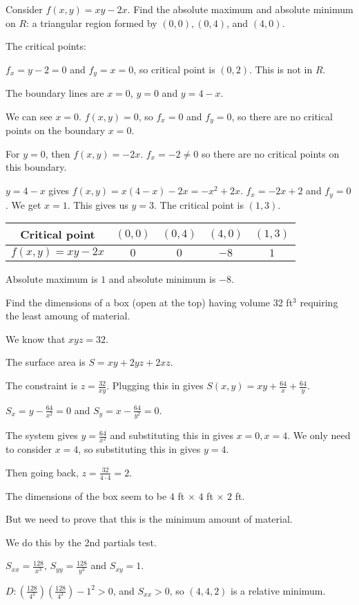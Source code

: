 \documentclass[../calc3.tex]{subfiles}
\begin{document}
\pagebreak
\begin{example}
    Consider $f(x,y)=xy-2x$. Find the absolute maximum and absolute minimum on $R$: a triangular region formed by $(0,0), (0,4)$, and $(4,0)$.

    The critical points:

    $f_x=y-2=0$ and $f_y=x=0$, so critical point is $(0,2)$. This is not in $R$.

    The boundary lines are $x=0$, $y=0$ and $y=4-x$.

    We can see $x=0$. $f(x,y)=0$, so $f_x=0$ and $f_y=0$, so there are no critical points on the boundary $x=0$.

    For $y=0$, then $f(x,y)=-2x$. $f_x=-2\neq 0$ so there are no critical points on this boundary.

    $y=4-x$ gives $f(x,y)=x(4-x)-2x=-x^2+2x$. $f_x=-2x+2$ and $f_y=0$. We get $x=1$. This gives us $y=3$. The critical point is $(1,3)$.

    \begin{center}
        \begin{tabular}{c|c|c|c|c}
            Critical point & $(0,0)$ & $(0,4)$ & $(4,0)$ & $(1,3)$ \\ \hline 
            $f(x,y)=xy-2x$ & $0$ & $0$ & $-8$ & $1$
        \end{tabular}
    \end{center}

    Absolute maximum is $1$ and absolute minimum is $-8$.
\end{example}

\begin{example}
    Find the dimensions of a box (open at the top) having volume 32 ft$^3$ requiring the least amoung of material.

    We know that $xyz=32$.

    The surface area is $S=xy+2yz+2xz$.

    The constraint is $z=\frac{32}{xy}$. Plugging this in gives $S(x,y)=xy+\frac{64}{x}+\frac{64}{y}$.

    $S_x=y-\frac{64}{x^2}=0$ and $S_y=x-\frac{64}{y^2}=0$.

    The system gives $y=\frac{64}{x^2}$ and substituting this in gives $x=0, x=4$. We only need to consider $x=4$, so substituting this in gives $y=4$.

    Then going back, $z=\frac{32}{4\cdot 4}=2$.

    The dimensions of the box seem to be $4$ ft $\times$ $4$ ft $\times$ $2$ ft.

    But we need to prove that this is the minimum amount of material.

    We do this by the 2nd partials test.

    $S_{xx}=\frac{128}{x^3}$, $S_{yy}=\frac{128}{y^3}$ and $S_{xy}=1$.

    $D: \left(\frac{128}{4^3}\right)\left(\frac{128}{4^3}\right)-1^2>0$, and $S_{xx}>0$, so $(4,4,2)$ is a relative minimum.
\end{example}
\end{document}
